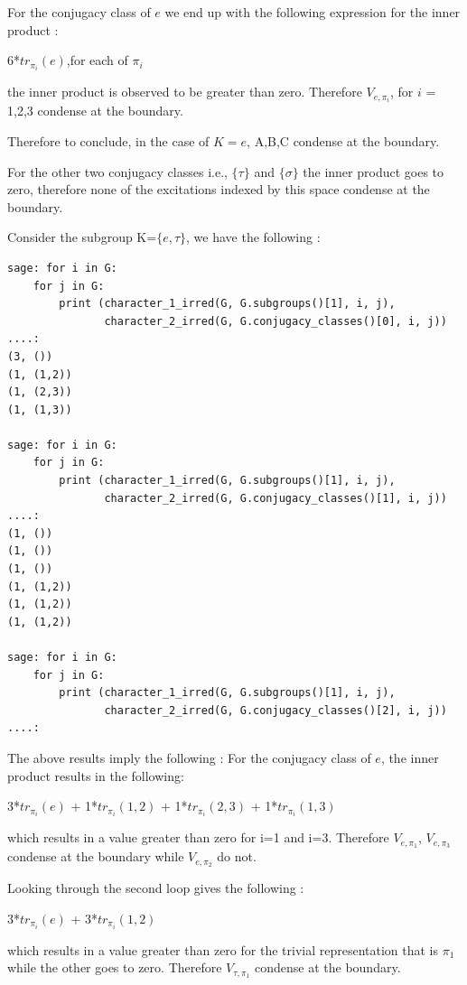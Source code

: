 For the conjugacy class of $e$ we end up with the following  expression for the inner product :
\begin{center}
6*$tr_{\pi_{i}}(e)$,for each of $\pi_{i}$ 
\end{center}
the inner product is observed to be greater than zero. Therefore $V_{e, \pi_{i}}$, for $i$ = 1,2,3 condense at the 
boundary. 

Therefore to conclude, in the case of $K={e}$, A,B,C condense at the boundary. 

For the other two conjugacy classes i.e., $\{\tau\}$ and $\{\sigma\}$ the inner product goes to zero, therefore none of the excitations indexed by this space
condense at the boundary.

Consider the subgroup K=$\{e, \tau\}$, we have the following :

\begin{lstlisting}[frame=single]
sage: for i in G:
    for j in G:
        print (character_1_irred(G, G.subgroups()[1], i, j), 
               character_2_irred(G, G.conjugacy_classes()[0], i, j))
....: 
(3, ())
(1, (1,2))
(1, (2,3))
(1, (1,3))

sage: for i in G:
    for j in G:
        print (character_1_irred(G, G.subgroups()[1], i, j), 
               character_2_irred(G, G.conjugacy_classes()[1], i, j))
....: 
(1, ())
(1, ())
(1, ())
(1, (1,2))
(1, (1,2))
(1, (1,2))

sage: for i in G:
    for j in G:
        print (character_1_irred(G, G.subgroups()[1], i, j), 
               character_2_irred(G, G.conjugacy_classes()[2], i, j))
....: 
\end{lstlisting}

The above results imply the following :
For the conjugacy class of $e$, the inner product results in the following:
\begin{center}
3*$tr_{\pi_{i}}(e)$ + 1*$tr_{\pi_{i}}(1,2)$ + 1*$tr_{\pi_{i}}(2,3)$ + 1*$tr_{\pi_{i}}(1,3)$
\end{center}
which results in a value greater than zero for i=1 and i=3. Therefore $V_{e, \pi_{1}}$, $V_{e, \pi_{3}}$
condense at the boundary while $V_{e, \pi_{2}}$ do not.

Looking through the second loop gives the following :
\begin{center}
3*$tr_{\pi_{i}}(e)$ + 3*$tr_{\pi_{i}}(1,2)$ 
\end{center}
which results  in a  value greater than zero for the trivial representation that is $\pi_{1}$ while the other 
goes to zero.  Therefore $V_{\tau, \pi_{1}}$ condense at the boundary.

